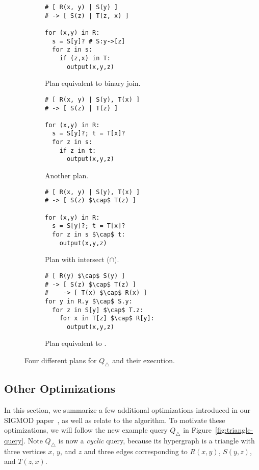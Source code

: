 \begin{figure*}
  \begin{subfigure}[t]{0.23\linewidth}
    \begin{lstlisting}
# [ R(x, y) | S(y) ]
# -> [ S(z) | T(z, x) ]

for (x,y) in R:
  s = S[y]? # S:y->[z]
  for z in s:
    if (z,x) in T:
      output(x,y,z)
\end{lstlisting}
    \caption{Plan equivalent to binary join.}
    \label{fig:bj-triangle}
  \end{subfigure}
  \begin{subfigure}[t]{0.25\linewidth}
    \begin{lstlisting}[numbers=none, showlines=true]
# [ R(x, y) | S(y), T(x) ]
# -> [ S(z) | T(z) ]

for (x,y) in R:
  s = S[y]?; t = T[x]?
  for z in s:
    if z in t:
      output(x,y,z)
\end{lstlisting}
    \caption{Another \FJ plan.}
    \label{fig:fj-triangle}
  \end{subfigure}
  \begin{subfigure}[t]{0.25\linewidth}
    \begin{lstlisting}[showlines=true]
# [ R(x, y) | S(y), T(x) ]
# -> [ S(z) $\cap$ T(z) ]

for (x,y) in R:
  s = S[y]?; t = T[x]?
  for z in s $\cap$ t:
    output(x,y,z)

\end{lstlisting}
    \caption{Plan with intersect ($\cap$).}
    \label{fig:inter-triangle}
  \end{subfigure}
  \begin{subfigure}[t]{0.25\linewidth}
    \begin{lstlisting}[showlines=true, numbers=none]
# [ R(y) $\cap$ S(y) ]
# -> [ S(z) $\cap$ T(z) ]
#    -> [ T(x) $\cap$ R(x) ]
for y in R.y $\cap$ S.y:
  for z in S[y] $\cap$ T.z:
    for x in T[z] $\cap$ R[y]:
      output(x,y,z)

\end{lstlisting}
    \caption{Plan equivalent to \GJ.}
    \label{fig:gj-triangle}
  \end{subfigure}
  \caption{Four different \FJ plans for $Q_\triangle$ and their execution.}
\end{figure*}

\subsection{Other Optimizations}\label{sec:other-optimizations}
In this section, we summarize a few additional optimizations
introduced in our SIGMOD paper~\cite{10.1145/3589295},
as well as relate \FJ to the \GJ algorithm.
To motivate these optimizations, we will follow the new example query
$Q_\triangle$ in Figure~\ref{fig:triangle-query}.
Note $Q_\triangle$ is now a {\em cyclic} query, because its hypergraph
is a triangle with three vertices $x$, $y$, and $z$ and three edges
corresponding to $R(x, y)$, $S(y,z)$, and $T(z, x)$.

